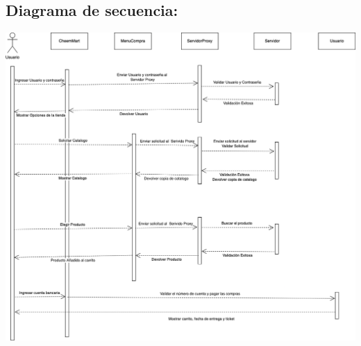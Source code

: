 \documentclass{article}
\begin{document}
\subsection*{Diagrama de secuencia:}
\begin{center}
  \includegraphics[scale=0.32]{./Proyecto01DiagramaSecuencia.png}
\end{center}
\end{document}
